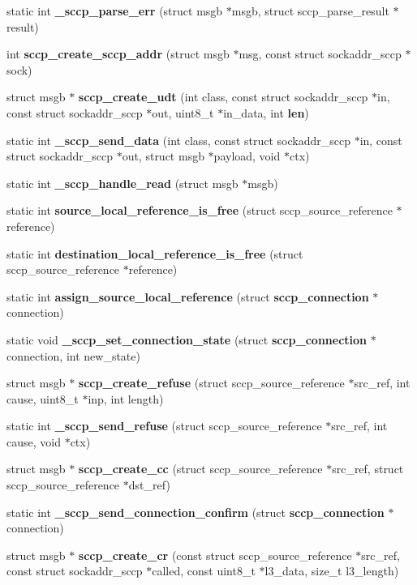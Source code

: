 \begin{DoxyCompactItemize}
\item 
static int {\bf \+\_\+sccp\+\_\+parse\+\_\+err} (struct msgb $\ast$msgb, struct sccp\+\_\+parse\+\_\+result $\ast$result)
\item 
int {\bf sccp\+\_\+create\+\_\+sccp\+\_\+addr} (struct msgb $\ast$msg, const struct sockaddr\+\_\+sccp $\ast$sock)
\item 
struct msgb $\ast$ {\bf sccp\+\_\+create\+\_\+udt} (int class, const struct sockaddr\+\_\+sccp $\ast$in, const struct sockaddr\+\_\+sccp $\ast$out, uint8\+\_\+t $\ast$in\+\_\+data, int {\bf len})
\item 
static int {\bf \+\_\+sccp\+\_\+send\+\_\+data} (int class, const struct sockaddr\+\_\+sccp $\ast$in, const struct sockaddr\+\_\+sccp $\ast$out, struct msgb $\ast$payload, void $\ast$ctx)
\item 
static int {\bf \+\_\+sccp\+\_\+handle\+\_\+read} (struct msgb $\ast$msgb)
\item 
static int {\bf source\+\_\+local\+\_\+reference\+\_\+is\+\_\+free} (struct sccp\+\_\+source\+\_\+reference $\ast$reference)
\item 
static int {\bf destination\+\_\+local\+\_\+reference\+\_\+is\+\_\+free} (struct sccp\+\_\+source\+\_\+reference $\ast$reference)
\item 
static int {\bf assign\+\_\+source\+\_\+local\+\_\+reference} (struct {\bf sccp\+\_\+connection} $\ast$connection)
\item 
static void {\bf \+\_\+sccp\+\_\+set\+\_\+connection\+\_\+state} (struct {\bf sccp\+\_\+connection} $\ast$connection, int new\+\_\+state)
\item 
struct msgb $\ast$ {\bf sccp\+\_\+create\+\_\+refuse} (struct sccp\+\_\+source\+\_\+reference $\ast$src\+\_\+ref, int cause, uint8\+\_\+t $\ast$inp, int length)
\item 
static int {\bf \+\_\+sccp\+\_\+send\+\_\+refuse} (struct sccp\+\_\+source\+\_\+reference $\ast$src\+\_\+ref, int cause, void $\ast$ctx)
\item 
struct msgb $\ast$ {\bf sccp\+\_\+create\+\_\+cc} (struct sccp\+\_\+source\+\_\+reference $\ast$src\+\_\+ref, struct sccp\+\_\+source\+\_\+reference $\ast$dst\+\_\+ref)
\item 
static int {\bf \+\_\+sccp\+\_\+send\+\_\+connection\+\_\+confirm} (struct {\bf sccp\+\_\+connection} $\ast$connection)
\item 
struct msgb $\ast$ {\bf sccp\+\_\+create\+\_\+cr} (const struct sccp\+\_\+source\+\_\+reference $\ast$src\+\_\+ref, const struct sockaddr\+\_\+sccp $\ast$called, const uint8\+\_\+t $\ast$l3\+\_\+data, size\+\_\+t l3\+\_\+length)

\end{DoxyCompactItemize}
